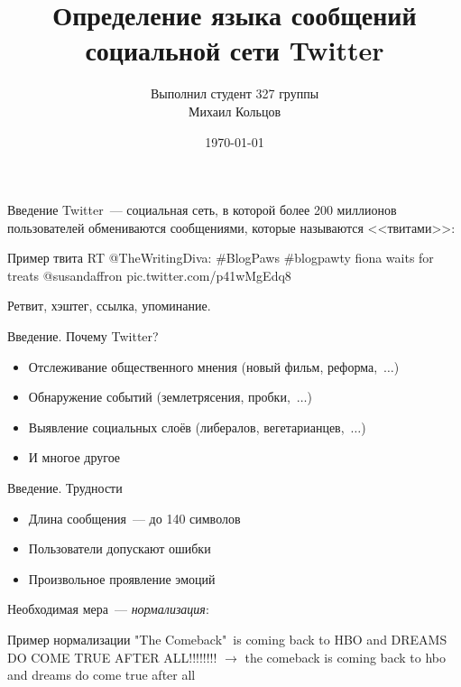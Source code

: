 \documentclass[mathserif,utf8,14pt]{beamer}
\title{Определение языка сообщений социальной сети Twitter}
\author{Выполнил студент 327 группы \\ Михаил Кольцов}
\institute{
Научный руководитель: \\
Владимир Майоров
}
\date{\today}
\begin{document}
\begin{frame}
    \maketitle
\end{frame}


\begin{frame}{Введение}
    Twitter~--- социальная сеть, в которой более 200 миллионов пользователей 
    обмениваются сообщениями, которые называются <<твитами>>: \\
    \begin{block}{Пример твита}
        {\color{red}RT @TheWritingDiva:} {\color{blue}\#BlogPaws \#blogpawty} fiona waits 
        for treats {\color{magenta}@susandaffron} {\color{violet}pic.twitter.com/p41wMgEdq8}
    \end{block}
    {\color{red}Ретвит}, {\color{blue}хэштег}, {\color{violet}ссылка}, {\color{magenta}упоминание}.
\end{frame}

\begin{frame}{Введение. Почему Twitter?}
    \begin{itemize}
        \item Отслеживание общественного мнения (новый фильм, реформа,~$\ldots$)
        \item Обнаружение событий (землетрясения, пробки,~$\ldots$)
        \item Выявление социальных слоёв (либералов, вегетарианцев,~$\ldots$)
        \item И многое другое 
    \end{itemize}
\end{frame}

\begin{frame}{Введение. Трудности}
    \begin{itemize}
        \item Длина сообщения~--- до 140 символов
        \item Пользователи допускают ошибки
        \item Произвольное проявление эмоций
    \end{itemize}
    Необходимая мера~--- \emph{нормализация}:
    \begin{block}{Пример нормализации}
        {\color{red}"The Comeback"\ is coming back to HBO and DREAMS DO COME TRUE AFTER ALL!!!!!!!!} $\to$ 
        the comeback is 
        coming back to hbo and dreams do come true after all
    \end{block}
\end{frame}
\end{document}
